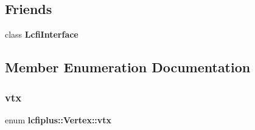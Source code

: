 \subsection*{Friends}
\begin{DoxyCompactItemize}
\item 
class \textbf{ Lcfi\+Interface}
\end{DoxyCompactItemize}


\subsection{Member Enumeration Documentation}
\mbox{\label{classlcfiplus_1_1Vertex_a15c01de5b17d87300723f511270c000e}} 
\subsubsection{vtx}
{\footnotesize\ttfamily enum \textbf{ lcfiplus\+::\+Vertex\+::vtx}}

